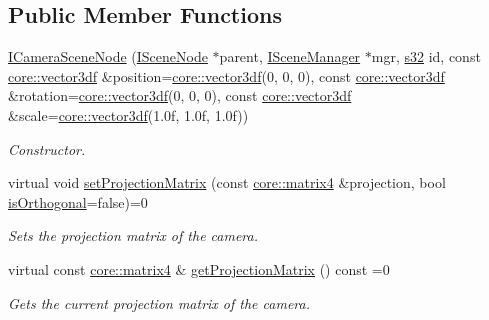 \subsection*{Public Member Functions}
\begin{DoxyCompactItemize}
\item 
\mbox{\label{classirr_1_1scene_1_1ICameraSceneNode_a80e2a6e96feaf3191129eb6abefebc6f}} 
\hyperlink{classirr_1_1scene_1_1ICameraSceneNode_a80e2a6e96feaf3191129eb6abefebc6f}{I\+Camera\+Scene\+Node} (\hyperlink{classirr_1_1scene_1_1ISceneNode}{I\+Scene\+Node} $\ast$parent, \hyperlink{classirr_1_1scene_1_1ISceneManager}{I\+Scene\+Manager} $\ast$mgr, \hyperlink{namespaceirr_ac66849b7a6ed16e30ebede579f9b47c6}{s32} id, const \hyperlink{namespaceirr_1_1core_a06f169d08b5c429f5575acb7edbad811}{core\+::vector3df} \&position=\hyperlink{namespaceirr_1_1core_a06f169d08b5c429f5575acb7edbad811}{core\+::vector3df}(0, 0, 0), const \hyperlink{namespaceirr_1_1core_a06f169d08b5c429f5575acb7edbad811}{core\+::vector3df} \&rotation=\hyperlink{namespaceirr_1_1core_a06f169d08b5c429f5575acb7edbad811}{core\+::vector3df}(0, 0, 0), const \hyperlink{namespaceirr_1_1core_a06f169d08b5c429f5575acb7edbad811}{core\+::vector3df} \&scale=\hyperlink{namespaceirr_1_1core_a06f169d08b5c429f5575acb7edbad811}{core\+::vector3df}(1.\+0f, 1.\+0f, 1.\+0f))
\begin{DoxyCompactList}\small\item\em Constructor. \end{DoxyCompactList}\item 
virtual void \hyperlink{classirr_1_1scene_1_1ICameraSceneNode_a022415e06070ad77c6053eba64ba62ae}{set\+Projection\+Matrix} (const \hyperlink{namespaceirr_1_1core_a73fa92e638c5ca97efd72da307cc9b65}{core\+::matrix4} \&projection, bool \hyperlink{classirr_1_1scene_1_1ICameraSceneNode_a5cfd588d836004923f01667543837d6c}{is\+Orthogonal}=false)=0
\begin{DoxyCompactList}\small\item\em Sets the projection matrix of the camera. \end{DoxyCompactList}\item 
virtual const \hyperlink{namespaceirr_1_1core_a73fa92e638c5ca97efd72da307cc9b65}{core\+::matrix4} \& \hyperlink{classirr_1_1scene_1_1ICameraSceneNode_a80f4a43d24dc31d797a84e0e2f62f1a1}{get\+Projection\+Matrix} () const =0
\begin{DoxyCompactList}\small\item\em Gets the current projection matrix of the camera. \end{DoxyCompactList}\item 

\end{DoxyCompactItemize}
